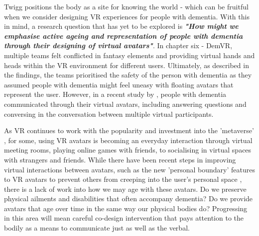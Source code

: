 Twigg positions the body as a site for knowing the world - which can be fruitful when we consider designing VR experiences for people with dementia. With this in mind, a research question that has yet to be explored is \textbf{\textit{"How might we emphasise active ageing and representation of people with dementia through their designing of virtual avatars"}}. In chapter six - DemVR, multiple teams felt conflicted in fantasy elements and providing virtual hands and heads within the VR environment for different users. Ultimately, as described in the findings, the teams prioritised the safety of the person with dementia as they assumed people with dementia might feel uneasy with floating avatars that represent the user. However, in a recent study by \cite{mendez2015virtual}, people with dementia communicated through their virtual avatars, including answering questions and conversing in the conversation between multiple virtual participants.

As VR continues to work with the popularity and investment into the 'metaverse' \citep{kraus2022facebook}, for some, using VR avatars is becoming an everyday interaction through virtual meeting rooms, playing online games with friends, to socialising in virtual spaces with strangers and friends. While there have been recent steps in improving virtual interactions between avatars, such as the new 'personal boundary' features to VR avatars to prevent others from creeping into the user's personal space \citep{sharma_2022}, there is a lack of work into how we may age with these avatars. Do we preserve physical ailments and disabilities that often accompany dementia? Do we provide avatars that age over time in the same way our physical bodies do? Progressing in this area will mean careful co-design intervention that pays attention to the bodily as a means to communicate just as well as the verbal.

